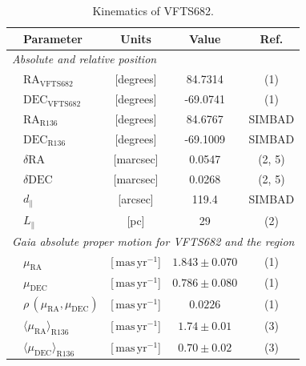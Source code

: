 \documentclass[apjl,twocolumn]{emulateapj}
\newcommand{\masyr}{\,\mathrm{mas}\,\mathrm{yr}^{-1}}
\begin{document}
\begin{table}
  \begin{center}
    \caption{Kinematics of VFTS682. }
    \begin{tabular}{llc|c|c}
      \hline
      \hline
      &Parameter & Units & Value & Ref.\\
      \hline
      \multicolumn{5}{l}{\emph{Absolute and relative position}} \\
      \hline
         &$\mathrm{RA}_\mathrm{VFTS682}$&[degrees] & \phantom{-0}84.7314 %
                     & (1) \\        
               &$\mathrm{DEC}_\mathrm{VFTS682}$&[degrees] & \phantom{0}-69.0741%
                     & (1)  \\    
                                                     
                        &$\mathrm{RA}_\mathrm{R136}$&[degrees] & \phantom{-0}84.6767
                     &  SIMBAD  \\        
               &$     \mathrm{DEC}_\mathrm{R136}$&[degrees] &  \phantom{0}-69.1009
                     &  SIMBAD \\       
        &$      \delta\mathrm{RA}$  &[marcsec] & \phantom{-0}0.0547                      
        &  (2, 5)
  \\        
               &$     \delta\mathrm{DEC}$  &[marcsec] & \phantom{-0}0.0268 
                     &  (2, 5) \\  
                       &$  d_\parallel$  & [arcsec]
                         & 119.4
                                 &  SIMBAD \\
      &$L_\parallel$ & [pc] & 29 & (2) \\
      
                          
                     \hline
           \multicolumn{5}{l}{\emph{Gaia absolute proper motion for VFTS682
      and the region}} \\
      \hline
          &$\mu_\mathrm{RA}$&[$\masyr$] & $1.843\pm 0.070$
                     & (1) \\        
               &$\mu_\mathrm{DEC}$&[$\masyr$] & $0.786\pm 0.080$
                     &  (1) \\        
                 & $\rho\,(\mu_\mathrm{RA}, \mu_\mathrm{DEC})$ &[$\masyr$] & $0.0226$
                        & (1)  \\         
       &$\langle\mu_\mathrm{RA}\rangle_\mathrm{R136}$&[$\masyr$] & $1.74\pm0.01$
                        & (3) \\
      &$\langle\mu_\mathrm{DEC}\rangle_\mathrm{R136}$&[$\masyr$]
                & $0.70\pm0.02$ &  (3)\\
\hline
      

\end{tabular}
\end{center}
\end{table}
\end{document}
